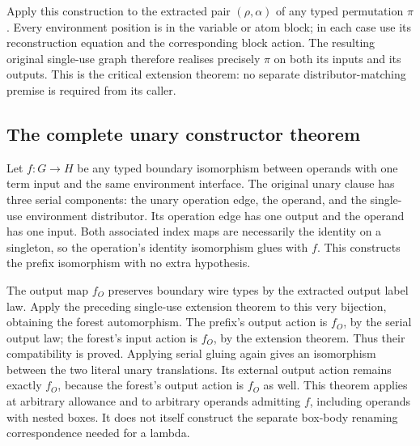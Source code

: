 
Apply this construction to the extracted pair $(\rho,\alpha)$ of any typed
permutation $\pi$. Every environment position is in the variable or atom block;
in each case use its reconstruction equation and the corresponding block action.
The resulting original single-use graph therefore realises precisely $\pi$
on both its inputs and its outputs. This is the critical extension theorem:
no separate distributor-matching premise is required from its caller.


\subsection{The complete unary constructor theorem}
Let $f:G\to H$ be any typed boundary isomorphism between operands with one
term input and the same environment interface. The original unary clause has
three serial components: the unary operation edge, the operand, and the
single-use environment distributor. Its operation edge has one output and the
operand has one input. Both associated index maps are necessarily the identity
on a singleton, so the operation's identity isomorphism glues with $f$.
This constructs the prefix isomorphism with no extra hypothesis.


The output map $f_O$ preserves boundary wire types by the extracted output
label law. Apply the preceding single-use extension theorem to this very
bijection, obtaining the forest automorphism. The prefix's output action is
$f_O$, by the serial output law; the forest's input action is $f_O$, by the
extension theorem. Thus their compatibility is proved. Applying serial gluing
again gives an isomorphism between the two literal unary translations. Its
external output action remains exactly $f_O$, because the forest's output action
is $f_O$ as well. This theorem applies at arbitrary allowance and to arbitrary
operands admitting $f$, including operands with nested boxes. It does not itself
construct the separate box-body renaming correspondence needed for a lambda.

